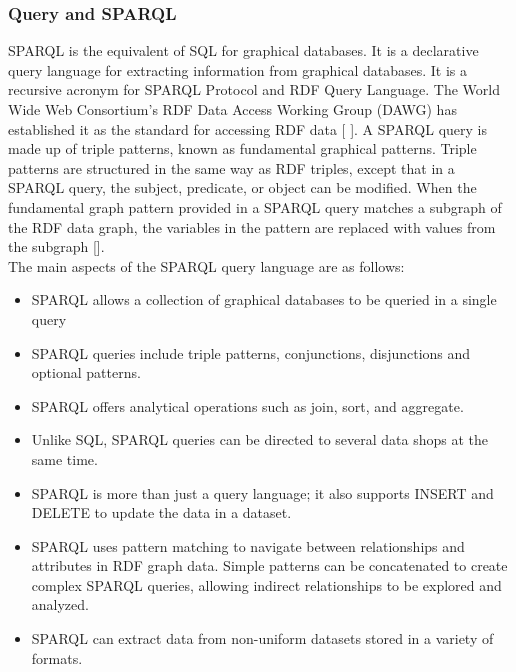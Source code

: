     \subsubsection{Query and SPARQL}
    SPARQL is the equivalent of SQL for graphical databases. It is a declarative query language for extracting information from graphical databases. It is a recursive acronym for SPARQL Protocol and RDF Query Language. The World Wide Web Consortium's RDF Data Access Working Group (DAWG) has established it as the standard for accessing RDF data [ ]. A SPARQL query is made up of triple patterns, known as fundamental graphical patterns. Triple patterns are structured in the same way as RDF triples, except that in a SPARQL query, the subject, predicate, or object can be modified. When the fundamental graph pattern provided in a SPARQL query matches a subgraph of the RDF data graph, the variables in the pattern are replaced with values from the subgraph [].\\

    The main aspects of the SPARQL query language are as follows: 

    \begin{itemize}
        \item SPARQL allows a collection of graphical databases to be queried in a single query 
        \item SPARQL queries include triple patterns, conjunctions, disjunctions and optional patterns. 
        \item SPARQL offers analytical operations such as join, sort, and aggregate. 
        \item Unlike SQL, SPARQL queries can be directed to several data shops at the same time. 
        \item SPARQL is more than just a query language; it also supports INSERT and DELETE to update the data in a dataset.
        \item SPARQL uses pattern matching to navigate between relationships and attributes in RDF graph data. Simple patterns can be concatenated to create complex SPARQL queries, allowing indirect relationships to be explored and analyzed. 
        \item SPARQL can extract data from non-uniform datasets stored in a variety of formats.
    \end{itemize}




